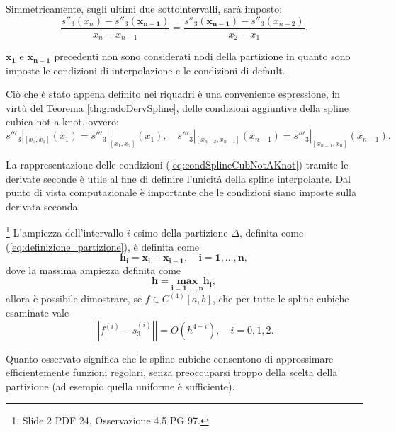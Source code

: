 Simmetricamente, sugli ultimi due sottointervalli, sarà imposto:
\begin{equation*}
    \boxed{\frac{s''_3(x_n)-s''_3(\boldsymbol{x_{n-1}})}{x_n-x_{n-1}}=\frac{s''_3(\boldsymbol{x_{n-1}})-s''_3(x_{n-2})}{x_2-x_1}.}
\end{equation*}

$\boldsymbol{x_1}$ e $\boldsymbol{x_{n-1}}$ precedenti non sono considerati nodi della partizione in quanto sono imposte le condizioni di interpolazione e le condizioni di default.

Ciò che è stato appena definito nei riquadri è una conveniente espressione, in virtù del Teorema \ref{th:gradoDervSpline}, delle condizioni aggiuntive della spline cubica not-a-knot, ovvero:
\begin{equation}\label{eq:condSplineCubNotAKnot}
    s'''_3|_{[x_0,x_1]}(x_1)=s'''_3|_{[x_1,x_2]}(x_1),\quad s'''_3|_{[x_{n-2},x_{n-1}]}(x_{n-1})=s'''_3|_{[x_{n-1},x_n]}(x_{n-1}).
\end{equation}

La rappresentazione delle condizioni (\ref{eq:condSplineCubNotAKnot}) tramite le derivate seconde è utile al fine di definire l'unicità della spline interpolante. Dal punto di vista computazionale è importante che le condizioni siano imposte sulla derivata seconda.

\begin{remark}
    \footnote{Slide 2 PDF 24, Osservazione 4.5 PG 97.} L'ampiezza dell'intervallo $i$-esimo della partizione $\Delta$, definita come (\ref{eq:definizione_partizione}), è definita come
    \begin{equation}\label{eq:ampiezza_partizione}
        \boldsymbol{h_i=x_i-x_{i-1},\quad i=1,\hdots,n},
    \end{equation}
    dove la massima ampiezza definita come 
    \begin{equation*}
        \boldsymbol{h=\underset{i=1,\hdots,n}{max}h_i},
    \end{equation*}
    allora è possibile dimostrare, se $f\in C^{(4)}[a,b]$, che per tutte le spline cubiche esaminate vale
    \begin{equation*}
        \left|\left|f^{(i)}-s^{(i)}_3\right|\right|=O\left(h^{4-i}\right),\quad i=0,1,2.
    \end{equation*}
\end{remark}

Quanto osservato significa che le spline cubiche consentono di approssimare efficientemente funzioni regolari, senza preoccuparsi troppo della scelta della partizione (ad esempio quella uniforme è sufficiente).

